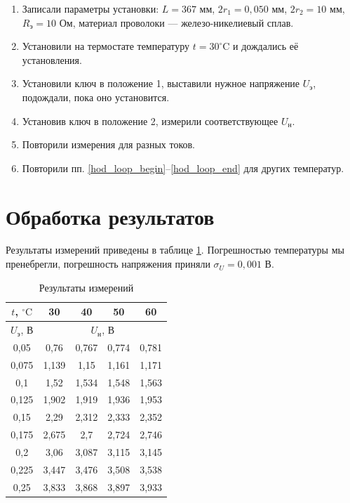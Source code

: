 \documentclass[12pt]{article}
\newcommand{\degC}{^\circ \text{C}}
\begin{document}
	\begin{enumerate}
		\item Записали параметры установки: $L=367$ мм, $2r_1=0{,}050$ мм, $2r_2=10$ мм, $R_\text{э}=10$ Ом, материал проволоки --- железо-никелиевый сплав.
		\item Установили на термостате температуру $t=30\degC$ и дождались её установления. \label{hod_loop_begin}
		\item Установили ключ в положение 1, выставили нужное напряжение $U_\text{э}$, подождали, пока оно установится.
		\item Установив ключ в положение 2, измерили соответствующее $U_\text{н}$.
		\item Повторили измерения для разных токов. \label{hod_loop_end}
		\item Повторили пп. \ref{hod_loop_begin}--\ref{hod_loop_end} для других температур.
	\end{enumerate}
	
	\section*{Обработка результатов}
	
	Результаты измерений приведены в таблице \ref{tb:meas_res}. Погрешностью температуры мы пренебрегли, погрешность напряжения приняли $\sigma_U=0{,}001$ В.
	
	\begin{table}[!h]
		\caption{Результаты измерений}
		\label{tb:meas_res}
		\begin{center}
		\begin{tabular}{|c|cccc|}
			\hline
			$t$, $\degC$ & 30 & 40 & 50 & 60 \\
			\hline
			$U_\text{э}$, В & \multicolumn{4}{c|}{$U_\text{н}$, В} \\
			\hline
			0,05 & 0,76 & 0,767 & 0,774 & 0,781 \\
			0,075 & 1,139 & 1,15 & 1,161 & 1,171 \\
			0,1 & 1,52 & 1,534 & 1,548 & 1,563 \\
			0,125 & 1,902 & 1,919 & 1,936 & 1,953 \\
			0,15 & 2,29 & 2,312 & 2,333 & 2,352 \\
			0,175 & 2,675 & 2,7 & 2,724 & 2,746 \\
			0,2 & 3,06 & 3,087 & 3,115 & 3,145 \\
			0,225 & 3,447 & 3,476 & 3,508 & 3,538 \\
			0,25 & 3,833 & 3,868 & 3,897 & 3,933 \\
			\hline
		\end{tabular}
		\end{center}
	\end{table}
	
\end{document}
